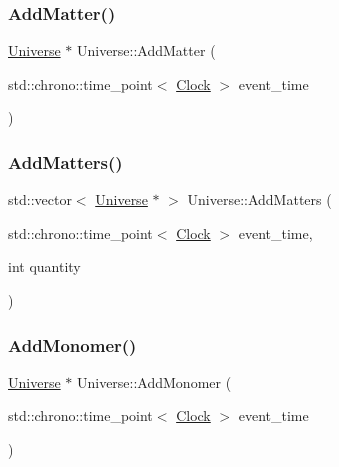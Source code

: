 \mbox{\label{classUniverse_a090d9ad1b88d81364e872e17d65edca4}} 
\subsubsection{\texorpdfstring{Add\+Matter()}{AddMatter()}}
{\footnotesize\ttfamily \mbox{\hyperlink{classUniverse}{Universe}} $\ast$ Universe\+::\+Add\+Matter (\begin{DoxyParamCaption}\item[{std\+::chrono\+::time\+\_\+point$<$ \mbox{\hyperlink{universe_8h_a0ef8d951d1ca5ab3cfaf7ab4c7a6fd80}{Clock}} $>$}]{event\+\_\+time }\end{DoxyParamCaption})}

\mbox{\label{classUniverse_ae00d10b2a23c9cedf1ff89e9da875563}} 
\subsubsection{\texorpdfstring{Add\+Matters()}{AddMatters()}}
{\footnotesize\ttfamily std\+::vector$<$ \mbox{\hyperlink{classUniverse}{Universe}} $\ast$ $>$ Universe\+::\+Add\+Matters (\begin{DoxyParamCaption}\item[{std\+::chrono\+::time\+\_\+point$<$ \mbox{\hyperlink{universe_8h_a0ef8d951d1ca5ab3cfaf7ab4c7a6fd80}{Clock}} $>$}]{event\+\_\+time,  }\item[{int}]{quantity }\end{DoxyParamCaption})}

\mbox{\label{classUniverse_a062a9472f0400e566ecc7dc056d989d9}} 
\subsubsection{\texorpdfstring{Add\+Monomer()}{AddMonomer()}}
{\footnotesize\ttfamily \mbox{\hyperlink{classUniverse}{Universe}} $\ast$ Universe\+::\+Add\+Monomer (\begin{DoxyParamCaption}\item[{std\+::chrono\+::time\+\_\+point$<$ \mbox{\hyperlink{universe_8h_a0ef8d951d1ca5ab3cfaf7ab4c7a6fd80}{Clock}} $>$}]{event\+\_\+time }\end{DoxyParamCaption})}

